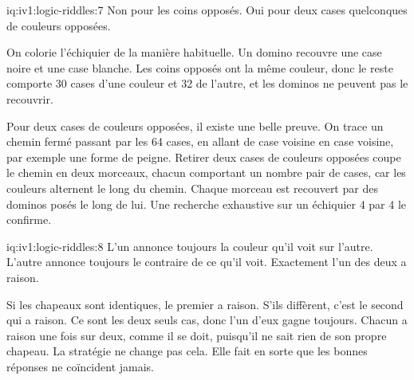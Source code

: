 \enlargethispage{-3\baselineskip}%
\begin{solution}{iq:iv1:logic-riddles:7}
Non pour les coins opposés. Oui pour deux cases quelconques de couleurs opposées.

On colorie l'échiquier de la manière habituelle. Un domino recouvre une case noire et une case blanche. Les coins opposés ont la même couleur, donc le reste comporte 30 cases d'une couleur et 32 de l'autre, et les dominos ne peuvent pas le recouvrir.

Pour deux cases de couleurs opposées, il existe une belle preuve. On trace un chemin fermé passant par les 64 cases, en allant de case voisine en case voisine, par exemple une forme de peigne. Retirer deux cases de couleurs opposées coupe le chemin en deux morceaux, chacun comportant un nombre pair de cases, car les couleurs alternent le long du chemin. Chaque morceau est recouvert par des dominos posés le long de lui. Une recherche exhaustive sur un échiquier 4 par 4 le confirme.

\end{solution}

\begin{solution}{iq:iv1:logic-riddles:8}
L'un annonce toujours la couleur qu'il voit sur l'autre. L'autre annonce toujours le contraire de ce qu'il voit. Exactement l'un des deux a raison.

Si les chapeaux sont identiques, le premier a raison. S'ils diffèrent, c'est le second qui a raison. Ce sont les deux seuls cas, donc l'un d'eux gagne toujours. Chacun a raison une fois sur deux, comme il se doit, puisqu'il ne sait rien de son propre chapeau. La stratégie ne change pas cela. Elle fait en sorte que les bonnes réponses ne coïncident jamais.

\end{solution}

